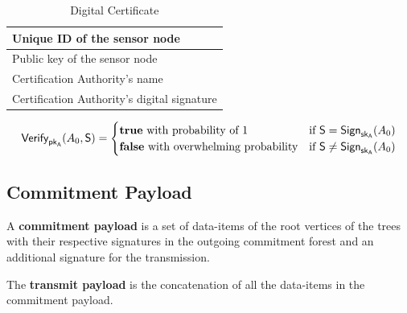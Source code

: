 \documentclass[%
  slidesonly,%
  semlayer%
  ]{seminar}                                  %
\newcommand{\sk}{\sf{sk}}
\newcommand{\pk}{\sf{pk}}
\begin{document}
\begin{slide}
      \begin{table}[!htb] 
          \caption{Digital Certificate}
          \label{table:digital-certificate}
          \centering
          \begin{tabular}{ |l| }
              \hline
              Unique ID of the sensor node \\
              \hline
              Public key of the sensor node \\  
              \hline
              Certification Authority's name \\
              \hline
              Certification Authority's digital signature \\
              \hline
          \end{tabular}
      \end{table}

      \begin{equation*}
        \textsf{Verify}_{\pk_{A}}(A_{0},\textsf{S}) = 
        \begin{cases}
         \textbf{true}\ \mbox{with probability of 1} & \mbox{if}\ \textsf{S} = \textsf{Sign}_{\sk_{A}}(A_{0})\\
         \textbf{false}\ \mbox{with overwhelming probability} & \mbox{if}\ \textsf{S} \neq \textsf{Sign}_{\sk_{A}}(A_{0})
        \end{cases}
      \end{equation*}

      \clearpage

    \subsection*{Commitment Payload}
        A \textbf{commitment payload} is a set of data-items of the root vertices of the trees with their respective signatures in the outgoing commitment forest and an additional signature for the transmission.
      
        The \textbf{transmit payload} is the concatenation of all the data-items in the commitment payload.
        \clearpage


\end{slide}
\end{document}
